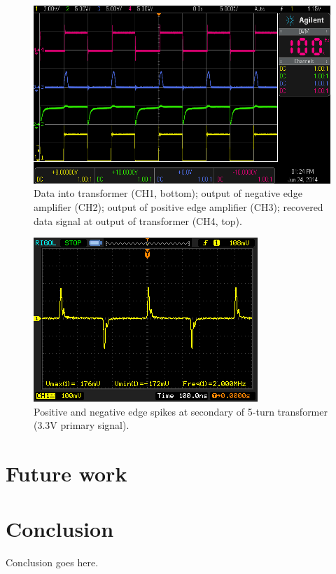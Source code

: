 \documentclass[conference]{IEEEtran}
\begin{document}
	\begin{figure}[t]
		\centering
		\includegraphics[width=0.8\columnwidth]{./img/DataUncropped}
		\caption{Data into transformer (CH1, bottom); output of negative edge amplifier (CH2); output of positive edge amplifier (CH3); recovered data signal at output of transformer (CH4, top).}
		\label{fig:Data}
	\end{figure}

	\begin{figure}[t]
		\centering
		\includegraphics[width=0.8\columnwidth]{./img/5turnTF}
		\caption{Positive and negative edge spikes at secondary of 5-turn transformer (3.3V primary signal).}
		\label{fig:5turnTF}
	\end{figure}

\section{Future work}

\section{Conclusion}

Conclusion goes here.






\end{document}
